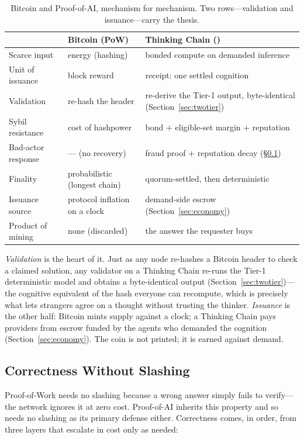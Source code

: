 \begin{table}[h]
\centering
\caption{Bitcoin and Proof-of-AI, mechanism for mechanism. Two rows---validation and issuance---carry the thesis.}
\label{tab:aibitcoin}
\small
\begin{tabular}{@{}p{3.1cm}p{4.4cm}p{5.4cm}@{}}
\toprule
 & Bitcoin (PoW) & Thinking Chain (\PoAI{}) \\
\midrule
Scarce input & energy (hashing) & bonded compute on demanded inference \\
Unit of issuance & block reward & \PoT{} receipt: one settled cognition \\
Validation & re-hash the header & re-derive the Tier-1 output, byte-identical (Section~\ref{sec:twotier}) \\
Sybil resistance & cost of hashpower & bond $+$ eligible-set margin $+$ reputation \\
Bad-actor response & --- (no recovery) & fraud proof $+$ reputation decay (\S\ref{sec:ai-bitcoin-noslash}) \\
Finality & probabilistic (longest chain) & quorum-settled, then deterministic \\
Issuance source & protocol inflation on a clock & demand-side escrow (Section~\ref{sec:economy}) \\
Product of mining & none (discarded) & the answer the requester buys \\
\bottomrule
\end{tabular}
\end{table}

\emph{Validation} is the heart of it. Just as any node re-hashes a Bitcoin header to check a claimed solution, any validator on a Thinking Chain re-runs the Tier-1 deterministic model and obtains a byte-identical output (Section~\ref{sec:twotier})---the cognitive equivalent of the hash everyone can recompute, which is precisely what lets strangers agree on a thought without trusting the thinker. \emph{Issuance} is the other half: Bitcoin mints supply against a clock; a Thinking Chain pays providers from escrow funded by the agents who demanded the cognition (Section~\ref{sec:economy}). The coin is not printed; it is earned against demand.

\subsection{Correctness Without Slashing}
\label{sec:ai-bitcoin-noslash}

Proof-of-Work needs no slashing because a wrong answer simply fails to verify---the network ignores it at zero cost. Proof-of-AI inherits this property and so needs no slashing as its primary defense either. Correctness comes, in order, from three layers that escalate in cost only as needed:

